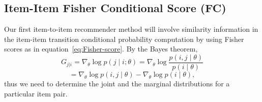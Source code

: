 \subsection{Item-Item Fisher Conditional Score (FC)}
\label{sec:fs_rank}
\label{sect:FC}

Our first item-to-item recommender method will involve similarity information in the item-item transition conditional probability computation by using Fisher scores as in equation~\eqref{eq:Fisher-score}.
By the Bayes theorem,
%
\begin{equation*}
G_{j|i} = \nabla_{\theta} \log p(j \mid i; \theta) = \nabla_{\theta} \log \frac{p(i,j \mid \theta)}{p(i \mid \theta)}
\nonumber
\end{equation*}
%
\begin{equation}
= \nabla_{\theta} \log p(i,j \mid \theta) - \nabla_{\theta} \log p(i \mid \theta),
\label{eq:fisher_score_cond}
\end{equation}
%
thus we need to determine the joint and the marginal distributions for a particular item pair. 

